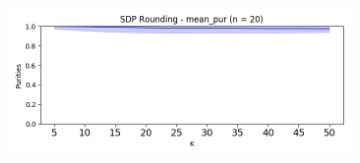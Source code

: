 \documentclass{article}
\begin{document}
\begin{figure}[h!]
\begin{subfigure}[t]{0.5\textwidth}
            \caption{}
        \end{subfigure}%
        ~ 
        \begin{subfigure}[t]{0.5\textwidth}
            \centering
            \includegraphics[width=\textwidth]{mean_pur_20n_true}
            \caption{}
        \end{subfigure}
    \end{figure}
\end{document}
